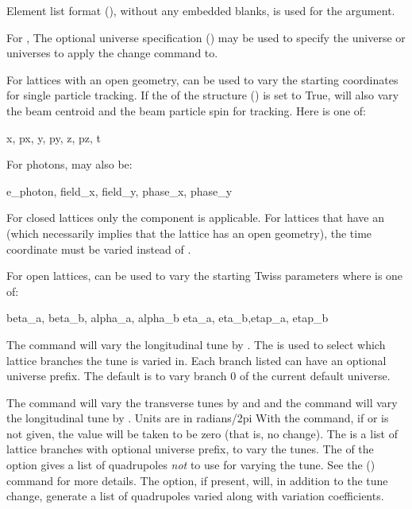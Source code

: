 Element list format (), without any embedded blanks, is used for
the  argument.

For , The optional  universe specification () may
be used to specify the universe or universes to apply the change command to.

For lattices with an open geometry,  can be used to
vary the starting coordinates for single particle tracking. If the  of the
 structure () is set to True,  will also vary the
beam centroid and the beam particle spin for tracking. Here  is one of:
\begin{example}
  x, px, y, py, z, pz, t
\end{example}
For photons,  may also be:
\begin{example}
  e_photon, field_x, field_y, phase_x, phase_y
\end{example}
For closed lattices only the  component is applicable. For lattices that have an 
(which necessarily implies that the lattice has an open geometry), the time  coordinate must
be varied instead of .

For open lattices,  can be used to vary the starting Twiss
parameters where  is one of:
\begin{example}
  beta_a, beta_b, alpha_a, alpha_b 
  eta_a, eta_b,etap_a, etap_b    
\end{example}

The  command will vary the longitudinal tune by . The 
is used to select which lattice branches the tune is varied in. Each branch listed can have an
optional universe prefix. The default is to vary branch 0 of the current default universe.

The  command will vary the transverse tunes by  and  and 
the  command will vary the longitudinal tune by . Units are in radians/2pi
With the  command, if  or  is not given, the value will
be taken to be zero (that is, no change). The  is a list of lattice
branches with optional universe prefix, to vary the tunes. The  of the 
option gives a list of quadrupoles {\em not} to use for varying the tune. See the 
() command for more details. The  option, if present, will, in
addition to the tune change, generate a list of quadrupoles varied along with variation
coefficients.

